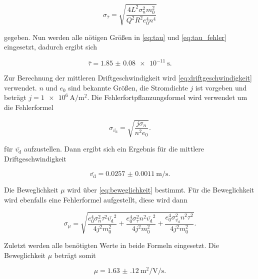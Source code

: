 \begin{equation}
    \sigma _{\bar{\tau}} = \sqrt{\frac{4 L^{2} \sigma_{n}^{2} m_{0}^{2}}{Q^{2} R^{2} e_{0}^{4} n^{4}}}
    \label{eq:tau_fehler}
\end{equation}

gegeben. 
Nun werden alle nötigen Größen in \autoref{eq:tau} und \autoref{eq:tau_fehler} eingesetzt, dadurch ergibt sich

\begin{equation}
    \bar{\tau} = \SI{1.85(8)e-11}{\second}.
    \label{eq:Tau1}
\end{equation}

Zur Berechnung der mittleren Driftgeschwindigkeit wird \autoref{eq:driftgeschwindigkeit} verwendet.
$n$ und $e_0$ sind bekannte Größen, die Stromdichte $j$ ist vorgeben und beträgt $j = \SI{1e6}{\ampere\per\meter\squared}$.
Die Fehlerfortpflanzungsformel wird verwendet um die Fehlerformel

\begin{equation}
    \sigma _{\bar{v_\text{d}}} = \sqrt{\frac{j \sigma _n}{n^2 e_0}}.
    \label{eq:vd_fehler}
\end{equation}

für $\bar{v_\text{d}}$ aufzustellen.
Dann ergibt sich ein Ergebnis für die mittlere Driftgeschwindigkeit 

\begin{equation}
    \bar{v_\text{d}} = \SI{0.0257(11)}{\meter\per\second}.
    \label{eq:vd1}
\end{equation}

Die Beweglichkeit $\mu$ wird über \autoref{eq:beweglichkeit} bestimmt.
Für die Beweglichkeit wird ebenfalls eine Fehlerformel aufgestellt, diese wird dann

\begin{equation}
    \sigma _{\mu} = \sqrt{\frac{e_{0}^{4} \sigma_{n}^{2} \tau^{2} {\bar{v_\text{d}}}^{2}}{4 j^{2} m_{0}^{2}} + \frac{e_{0}^{4} \sigma_{\tau}^{2} n^{2} {\bar{v_\text{d}}}^{2}}{4 j^{2} m_{0}^{2}} + \frac{e_{0}^{4} \sigma_{\bar{v_\text{d}}}^{2} n^{2} \tau^{2}}{4 j^{2} m_{0}^{2}}}.
    \label{eq:bewegl_fehler}
\end{equation}

Zuletzt werden alle benötigten Werte in beide Formeln eingesetzt.
Die Beweglichkeit $\mu$ beträgt somit

\begin{equation}
    \mu = \SI{1.63(12)}{\meter\squared\per\volt\per\second}.
    \label{eq:bewegl1}
\end{equation}

